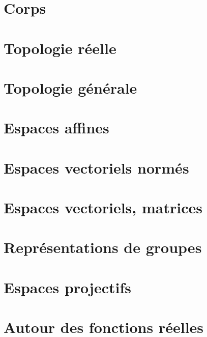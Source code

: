 \chapter{Corps}




\chapter{Topologie réelle}


\chapter{Topologie générale}


\chapter{Espaces affines}


\chapter{Espaces vectoriels normés}


\chapter{Espaces vectoriels, matrices}






\chapter{Représentations de groupes}


\chapter{Espaces projectifs}


\chapter{Autour des fonctions réelles}







